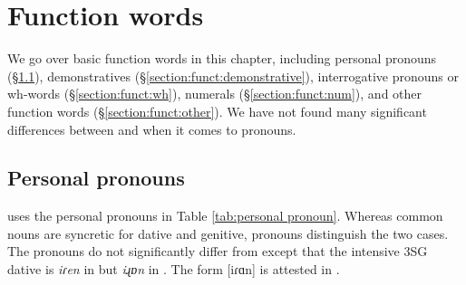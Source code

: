 \chapter{Function words}\label{chapter:funct}

We go over basic function words in this chapter, including personal pronouns (\S\ref{section:funct:personal pronoun}), demonstratives (\S\ref{section:funct:demonstrative}), interrogative pronouns or wh-words (\S\ref{section:funct:wh}),  numerals (\S\ref{section:funct:num}), and other function words (\S\ref{section:funct:other}). We have not found many significant differences between {\iaIA} and {\seaSEA} when it comes to pronouns. 

\section{Personal pronouns}\label{section:funct:personal pronoun}

{\iaIA} uses the    personal pronouns in Table \ref{tab:personal pronoun}. Whereas common nouns are syncretic for dative and genitive, pronouns distinguish the two cases. The {\iaIA} pronouns do not significantly differ from {\seaSE} \citep[123]{DumTragut-2009-ArmenianReferenceGrammar} except that the intensive 3SG dative is \textit{iɾen} in {\seaSE} but \textit{iɻɒn} in {\iaIA}.  The form [iɾɑn] is attested in {\seaCEA} \citep[128]{DumTragut-2009-ArmenianReferenceGrammar}. 

